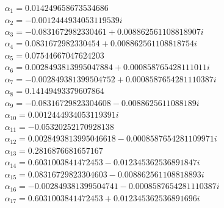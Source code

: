 \documentclass[aps,reprint,notitlepage,onecolumn,12pt]{revtex4-2}
\numberwithin{equation}{section}
\begin{document}
\begin{align}
&\alpha_{1}=0.014249658673534686\nonumber \\
&\alpha_{2}=-0.0012444934053119539 i\nonumber \\
&\alpha_{3}=-0.0831672982330461+0.008862561108818907i\nonumber \\
&\alpha_{4}=0.0831672982330454+0.008862561108818754i\nonumber \\
&\alpha_{5}=0.07544667047624203\nonumber \\
&\alpha_{6}=0.0028493813995047884+0.000858765428111011i\nonumber \\
&\alpha_{7}=-0.002849381399504752+0.0008587654281110387i\nonumber \\
&\alpha_{8}=0.14149493379607864\nonumber \\
&\alpha_{9}=-0.08316729823304608-0.0088625611088189i\nonumber \\
&\alpha_{10}=0.0012444934053119391i\nonumber \\
&\alpha_{11}=-0.05320252170928138\nonumber \\
&\alpha_{12}=0.0028493813995046618-0.0008587654281109971i\nonumber \\
&\alpha_{13}=0.2816876681657167\nonumber \\
&\alpha_{14}=0.6031003841472453-0.012345362536891847i\nonumber \\
&\alpha_{15}=0.08316729823304603-0.008862561108818893i\nonumber \\
&\alpha_{16}=-0.002849381399504741-0.0008587654281110387i\nonumber \\
&\alpha_{17}=0.6031003841472453+0.012345362536891696i\nonumber \\
\end{align}

\pagebreak


% 
\end{document}
